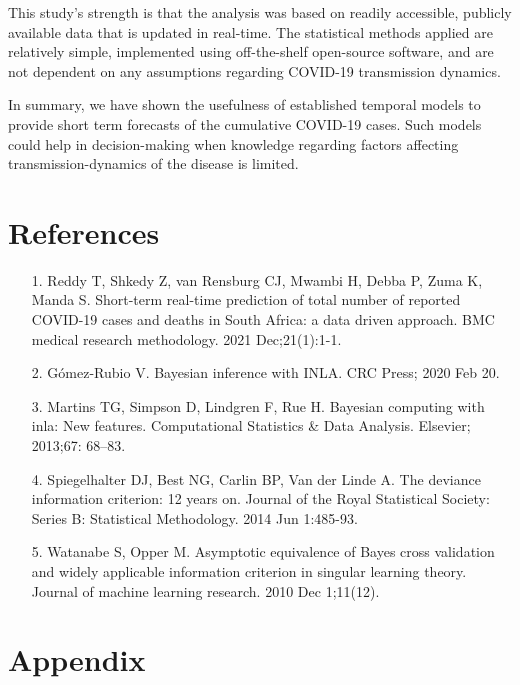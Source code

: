 \documentclass[10pt,letterpaper]{article}
\begin{document}
This study's strength is that the analysis was based on readily accessible, publicly available data that is updated in real-time. The statistical methods applied are relatively simple, implemented using off-the-shelf open-source software, and are not dependent on any assumptions regarding COVID-19 transmission dynamics. 

In summary, we have shown the usefulness of established temporal models to provide short term forecasts of the cumulative COVID-19 cases. Such models could help in decision-making when knowledge regarding factors affecting transmission-dynamics of the disease is limited.  

\newpage
\hypertarget{references}{%
	\section*{References}\label{references}}

\begin{itemize}
	\item[1.] Reddy T, Shkedy Z, van Rensburg CJ, Mwambi H, Debba P, Zuma K, Manda S. Short-term real-time prediction of total number of reported COVID-19 cases and deaths in South Africa: a data driven approach. BMC medical research methodology. 2021 Dec;21(1):1-1.
	
	\item[2.] Gómez-Rubio V. Bayesian inference with INLA. CRC Press; 2020 Feb 20.
	
	\item[3.] Martins TG, Simpson D, Lindgren F, Rue H. Bayesian computing with
	inla: New features. Computational Statistics \& Data Analysis. Elsevier;
	2013;67: 68--83.
	\item[4.] Spiegelhalter DJ, Best NG, Carlin BP, Van der Linde A. The deviance information criterion: 12 years on. Journal of the Royal Statistical Society: Series B: Statistical Methodology. 2014 Jun 1:485-93.
	\item[5.] Watanabe S, Opper M. Asymptotic equivalence of Bayes cross validation and widely applicable information criterion in singular learning theory. Journal of machine learning research. 2010 Dec 1;11(12).
	
\end{itemize}
\nolinenumbers
\newpage
\hypertarget{appendix}{%
\section{Appendix}\label{appendix}}
\end{document}

